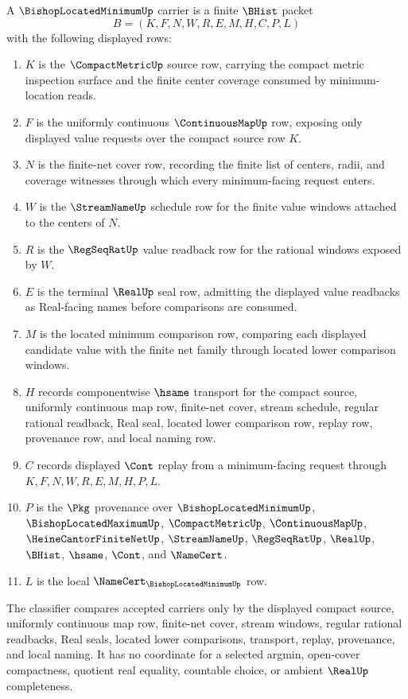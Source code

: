 \begin{definition}
\label{def:bishop-located-minimum-carrier}
A $\BishopLocatedMinimumUp$ carrier is a finite $\BHist$ packet
$$
B=(K,F,N,W,R,E,M,H,C,P,L)
$$
with the following displayed rows:
\begin{enumerate}
\item $K$ is the $\CompactMetricUp$ source row, carrying the compact metric inspection surface and the finite center coverage consumed by minimum-location reads.
\item $F$ is the uniformly continuous $\ContinuousMapUp$ row, exposing only displayed value requests over the compact source row $K$.
\item $N$ is the finite-net cover row, recording the finite list of centers, radii, and coverage witnesses through which every minimum-facing request enters.
\item $W$ is the $\StreamNameUp$ schedule row for the finite value windows attached to the centers of $N$.
\item $R$ is the $\RegSeqRatUp$ value readback row for the rational windows exposed by $W$.
\item $E$ is the terminal $\RealUp$ seal row, admitting the displayed value readbacks as Real-facing names before comparisons are consumed.
\item $M$ is the located minimum comparison row, comparing each displayed candidate value with the finite net family through located lower comparison windows.
\item $H$ records componentwise $\hsame$ transport for the compact source, uniformly continuous map row, finite-net cover, stream schedule, regular rational readback, Real seal, located lower comparison row, replay row, provenance row, and local naming row.
\item $C$ records displayed $\Cont$ replay from a minimum-facing request through $K,F,N,W,R,E,M,H,P,L$.
\item $P$ is the $\Pkg$ provenance over $\BishopLocatedMinimumUp$, $\BishopLocatedMaximumUp$, $\CompactMetricUp$, $\ContinuousMapUp$, $\HeineCantorFiniteNetUp$, $\StreamNameUp$, $\RegSeqRatUp$, $\RealUp$, $\BHist$, $\hsame$, $\Cont$, and $\NameCert$.
\item $L$ is the local $\NameCert_{\BishopLocatedMinimumUp}$ row.
\end{enumerate}
The classifier compares accepted carriers only by the displayed compact source, uniformly continuous map row, finite-net cover, stream windows, regular rational readbacks, Real seals, located lower comparisons, transport, replay, provenance, and local naming. It has no coordinate for a selected argmin, open-cover compactness, quotient real equality, countable choice, or ambient $\RealUp$ completeness.
\end{definition}


